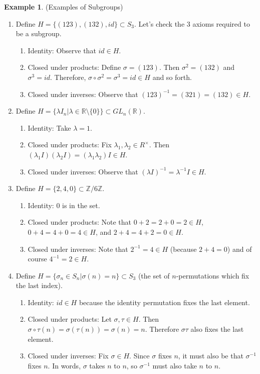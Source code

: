 \documentclass[12pt]{article}
\theoremstyle{definition}
\newtheorem{example}{Example}
\theoremstyle{definition}
\begin{document}
\begin{example}(Examples of Subgroups)
\begin{enumerate}
	\item Define $H = \{ (1 2 3), (1 3 2), id \} \subset S_3$. Let's check the 3 axioms required to be a subgroup.
	\begin{enumerate}
		\item Identity: Observe that $id \in H$.
		\item Closed under products: Define $\sigma = (1 2 3)$. Then $\sigma^2 = (1 3 2)$ and $\sigma^3 = id$. Therefore, $\sigma \circ \sigma^2 = \sigma^3 = id \in H$ and so forth. 
		\item Closed under inverses: Observe that $(1 2 3)^{-1} = (3 2 1) = (1 3 2) \in H$. 
	\end{enumerate}
	\item Define $H = \{ \lambda I_n \vert \lambda \in \mathbb{R} \setminus \{0\} \} \subset GL_n(\mathbb{R})$.
	\begin{enumerate}
		\item Identity: Take $\lambda = 1$.
		\item Closed under products: Fix $\lambda_1, \lambda_2 \in R^{\times}$. Then $(\lambda_1 I)(\lambda_2 I) = (\lambda_1 \lambda_2) I \in H$.
		\item Closed under inverses: Observe that $(\lambda I)^{-1} = \lambda^{-1} I \in H$.
	\end{enumerate}
	\item Define $H = \{2, 4, 0 \} \subset \mathbb{Z} / 6 \mathbb{Z}$.
	\begin{enumerate}
		\item Identity: $0$ is in the set.
		\item Closed under products: Note that $0 + 2 = 2 + 0 = 2 \in H$, $0 + 4 = 4 + 0 = 4 \in H$, and $2 + 4 = 4 + 2 = 0 \in H$.
		\item Closed under inverses: Note that $2^{-1} = 4 \in H$ (because $2 + 4 = 0$) and of course $4^{-1} = 2 \in H$.
	\end{enumerate}
	\item Define $H = \{ \sigma_n \in S_n | \sigma(n) = n \} \subset S_3$ (the set of $n$-permutations which fix the last index).
	\begin{enumerate}
		\item Identity: $id \in H$ because the identity permutation fixes the last element.
		\item Closed under products: Let $\sigma, \tau \in H$. Then $\sigma \circ \tau (n) = \sigma(\tau(n)) = \sigma(n) = n$. Therefore $\sigma \tau$ also fixes the last element.
		\item Closed under inverses: Fix $\sigma \in H$. Since $\sigma$ fixes $n$, it must also be that $\sigma^{-1}$ fixes $n$. In words, $\sigma$ takes $n$ to $n$, so $\sigma^{-1}$ must also take $n$ to $n$.
	\end{enumerate}
\end{enumerate}
\end{example}
\end{document}
